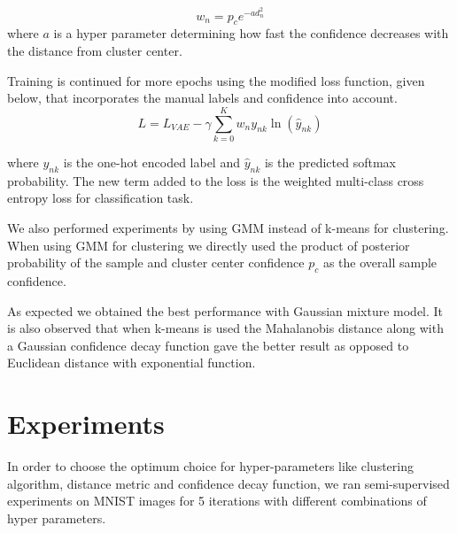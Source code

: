 \documentclass[runningheads]{llncs}
\begin{document}
\begin{equation}
    w_n = p_ce^{-a d_n^2}
    \label{gaussian_decay}
\end{equation}
where $a$ is a hyper parameter determining how fast the confidence decreases with the distance from cluster center.


Training is continued for more epochs using the modified loss function, given below, that incorporates the manual labels and confidence into account.
\begin{equation} \label{semi_supervised_loss}
L = L_{VAE}  - \gamma \sum_{k=0}^{K}w_{n}y_{nk}\ln(\hat{y}_{nk})
\end{equation}

where $y_{nk}$ is the one-hot encoded label and $\hat{y}_{nk}$ is the predicted softmax probability.
The new term added to the loss is the weighted multi-class cross entropy loss for classification task.


We also performed experiments by using GMM instead of k-means for clustering.
When using GMM for clustering we directly used the product of posterior probability of the sample and cluster center confidence $p_c$ as the overall sample confidence.

As expected we obtained the best performance with Gaussian mixture model.
It is also observed that when k-means is used the Mahalanobis distance along with a Gaussian confidence decay function gave the better result as opposed to Euclidean distance with exponential function.
\section{Experiments}
In order to choose the optimum choice for hyper-parameters like clustering algorithm, distance metric and confidence decay function, we ran semi-supervised experiments on MNIST images for 5 iterations with different combinations of hyper parameters.
\end{document}
